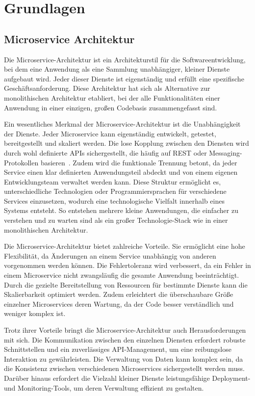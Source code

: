 \chapter{Grundlagen}\label{ch:foundation}

\section{Microservice Architektur}\label{sec:foundation_microservices}

Die Microservice-Architektur ist ein Architekturstil für die Softwareentwicklung, bei dem eine Anwendung als eine Sammlung unabhängiger, kleiner Dienste aufgebaut wird.
Jeder dieser Dienste ist eigenständig und erfüllt eine spezifische Geschäftsanforderung.
Diese Architektur hat sich als Alternative zur monolithischen Architektur etabliert, bei der alle Funktionalitäten einer Anwendung in einer einzigen, großen Codebasis zusammengefasst sind.

Ein wesentliches Merkmal der Microservice-Architektur ist die Unabhängigkeit der Dienste.
Jeder Microservice kann eigenständig entwickelt, getestet, bereitgestellt und skaliert werden.
Die lose Kopplung zwischen den Diensten wird durch wohl definierte \glspl{API} sichergestellt, die häufig auf REST
oder Messaging-Protokollen basieren~\cite{richardsonMicroservicesPatterns2018}.
Zudem wird die funktionale Trennung betont, da jeder Service einen klar definierten Anwendungsteil abdeckt und von einem eigenen Entwicklungsteam verwaltet werden kann.
Diese Struktur ermöglicht es, unterschiedliche Technologien oder Programmiersprachen für verschiedene Services einzusetzen, wodurch eine technologische Vielfalt innerhalb eines Systems entsteht.
So entstehen mehrere kleine Anwendungen, die einfacher zu verstehen und zu warten sind als ein großer
Technologie-Stack wie in einer monolithischen Architektur.

Die Microservice-Architektur bietet zahlreiche Vorteile.
Sie ermöglicht eine hohe Flexibilität, da Änderungen an einem Service unabhängig von anderen vorgenommen werden können.
Die Fehlertoleranz wird verbessert, da ein Fehler in einem Microservice nicht zwangsläufig die gesamte Anwendung beeinträchtigt.
Durch die gezielte Bereitstellung von Ressourcen für bestimmte Dienste kann die Skalierbarkeit optimiert werden.
Zudem erleichtert die überschaubare Größe einzelner Microservices deren Wartung, da der Code besser verständlich und weniger komplex ist.

Trotz ihrer Vorteile bringt die Microservice-Architektur auch Herausforderungen mit sich.
Die Kommunikation zwischen den einzelnen Diensten erfordert robuste Schnittstellen und ein zuverlässiges \gls{API}-Management, um eine reibungslose Interaktion zu gewährleisten.
Die Verwaltung von Daten kann komplex sein, da die Konsistenz zwischen verschiedenen Microservices sichergestellt
werden muss.
Darüber hinaus erfordert die Vielzahl kleiner Dienste leistungsfähige Deployment- und Monitoring-Tools, um deren Verwaltung effizient zu gestalten.

